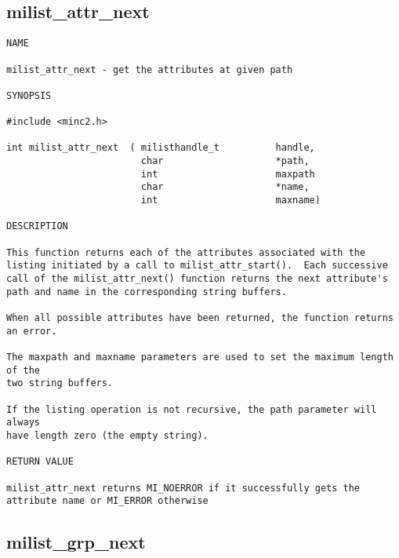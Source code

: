 \documentclass{article}
\begin{document}
\subsection{milist\_attr\_next}

\begin{verbatim}
NAME 

milist_attr_next - get the attributes at given path

SYNOPSIS

#include <minc2.h>

int milist_attr_next  ( milisthandle_t          handle,
                        char                    *path,
                        int                     maxpath
                        char                    *name,
                        int                     maxname)

DESCRIPTION

This function returns each of the attributes associated with the
listing initiated by a call to milist_attr_start().  Each successive
call of the milist_attr_next() function returns the next attribute's
path and name in the corresponding string buffers.  

When all possible attributes have been returned, the function returns
an error.

The maxpath and maxname parameters are used to set the maximum length of the
two string buffers.

If the listing operation is not recursive, the path parameter will always
have length zero (the empty string).

RETURN VALUE

milist_attr_next returns MI_NOERROR if it successfully gets the
attribute name or MI_ERROR otherwise

\end{verbatim}

\subsection{milist\_grp\_next}
\end{document}

